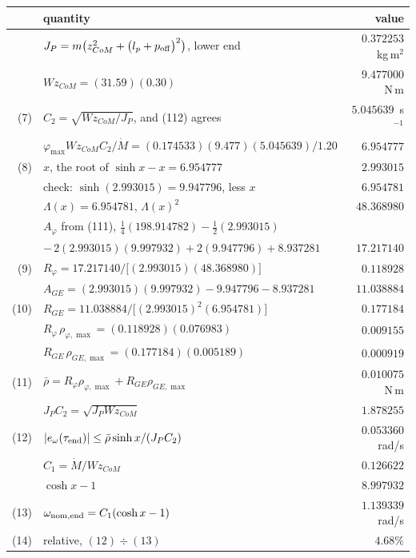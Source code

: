 \documentclass[10pt]{article}
\newcommand{\Wz}{W\!z_{CoM}}
\newcommand{\lpo}{\bigl(l_p + p_{\rm off}\bigr)}
\begin{document}
\begin{center}\small
\begin{tabular}{@{}rlr@{}}
\toprule
 & quantity & value \\
\midrule
   & $J_P = m\bigl(z_{CoM}^2+\lpo^2\bigr)$, lower end
     & $0.372253$~kg\,m$^2$ \\
   & $\Wz = (31.59)(0.30)$ & $9.477000$~N\,m \\
(7)& $C_2 = \sqrt{\Wz/J_P}$, and (112) agrees & $5.045639$~s$^{-1}$ \\
\midrule
   & $\varphi_{\max}\Wz C_2/\dot M
       = (0.174533)(9.477)(5.045639)/1.20$ & $6.954777$ \\
(8)& $x$, the root of $\sinh x - x = 6.954777$ & $2.993015$ \\
   & \quad check: $\sinh(2.993015) = 9.947796$, less $x$
     & $6.954781$ \\
   & $\Lambda(x) = 6.954781$, $\Lambda(x)^2$ & $48.368980$ \\
\midrule
   & $A_\varphi$ from (111), $\tfrac14(198.914782) - \tfrac12(2.993015)$ & \\
   & \quad $-\,2(2.993015)(9.997932) + 2(9.947796) + 8.937281$
     & $17.217140$ \\
(9)& $R_\varphi = 17.217140/\bigl[(2.993015)(48.368980)\bigr]$
   & $0.118928$ \\
   & $A_{GE} = (2.993015)(9.997932) - 9.947796 - 8.937281$
     & $11.038884$ \\
(10)& $R_{GE} = 11.038884/\bigl[(2.993015)^2(6.954781)\bigr]$
   & $0.177184$ \\
\midrule
   & $R_\varphi\,\rho_{\varphi,\max} = (0.118928)(0.076983)$ & $0.009155$ \\
   & $R_{GE}\,\rho_{GE,\max} = (0.177184)(0.005189)$ & $0.000919$ \\
(11)& $\bar\rho = R_\varphi\rho_{\varphi,\max} + R_{GE}\rho_{GE,\max}$
   & $0.010075$~N\,m \\
\midrule
   & $J_PC_2 = \sqrt{J_P\Wz}$ & $1.878255$ \\
(12)& $|e_\omega(\tau_{\rm end})| \le \bar\rho\sinh x/(J_PC_2)$
   & $0.053360$~rad/s \\
\midrule
   & $C_1 = \dot M/\Wz$ & $0.126622$ \\
   & $\cosh x - 1$ & $8.997932$ \\
(13)& $\omega_{\rm nom,end} = C_1(\cosh x - 1)$ & $1.139339$~rad/s \\
(14)& relative, $(12)\div(13)$ & $4.68\%$ \\
\bottomrule
\end{tabular}
\end{center}
\end{document}
